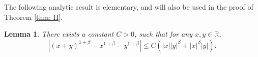 \documentclass[12pt,a4paper]{amsart}
\theoremstyle{plain}
\newtheorem{lem}[thm]{Lemma}
\theoremstyle{definition}
\numberwithin{equation}{section}
\begin{document}
	The following analytic result is elementary, and will also be used in the proof of Theorem \ref{thm: II}.
	\begin{lem}
\label{ineq: analysis}
	There exists a constant $C>0$, such that for any $x,y \in \mathbb R$,
\[
    |(x+y)^{1+\beta}-x^{1+\beta}-y^{1+\beta}|
    \leq C(|x||y|^{\beta}+|x|^{\beta}|y|).
\]
\end{lem}
\begin{comment}
\begin{proof}
   	Note that
\[
  	\lim_{|y|\rightarrow \infty}\frac{(y+1)^{1+\beta}-y^{1+\beta}-1}{y^{\beta}}
  	=\lim_{|y|\rightarrow \infty}\frac{(y+1)^{1+\beta}-y^{1+\beta}}{y^{\beta}}
  	=\lim_{|y|\rightarrow \infty}\big((1+\frac{1}{y})^{1+\beta}-1\big)y = 1+\beta.
\]
	Using this and continuity, we get that there exists $C_1>0$ such that for all $|y|\geq 1$,
\[
  	|(1+y)^{1+\beta}-y^{1+\beta}-1|
  	\leq C_1 |y|^{\beta}.
\]
 	Note that if $x = 0$ or $y= 0$, then the desired result is trivial.
	So we only need to consider the case that $x \neq 0$ and $y \neq 0$.
 	In this case, if $|x|\geq |y|$, we have
\[
	|(x+y)^{1+\beta}-x^{1+\beta}-y^{1+\beta}|
	\leq |y|^{1+\beta}\bigg(\Big|\Big(1+\frac{x}{y}\Big)^{1+\beta}-\Big(\frac{x}{y}\Big)^{1+\beta}-1\Big|\bigg)
	\leq C_1|y||x|^{\beta};
\]
	and  if $|x|\leq |y|$, we have
\[
	|(x+y)^{1+\beta}-x^{1+\beta}-y^{1+\beta}|
	\leq |x|^{1+\beta}\bigg( \Big| \Big(1+\frac{y}{x}\Big)^{1+\beta}-\Big(\frac{y}{x}\Big)^{1+\beta}-1\Big|\bigg)
	\leq C_1|x||y|^{\beta}.
\]
	Combining the above, we immediately get the desired result.
\end{proof}
\end{comment}
\end{document}
